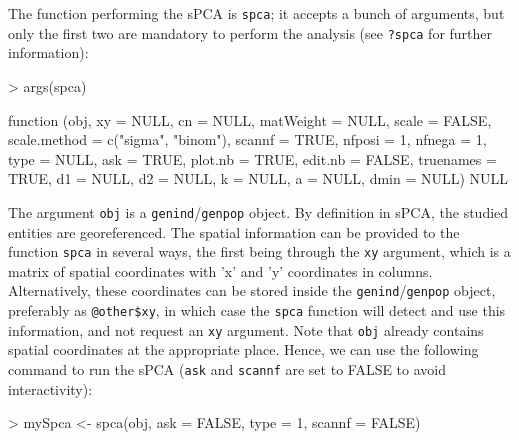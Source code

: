 \documentclass{article}
\begin{document}
The function performing the sPCA is \texttt{spca}; it accepts a bunch
of arguments, but only the first two are mandatory to perform the
analysis (see \texttt{?spca} for further information):
\begin{Schunk}
\begin{Sinput}
> args(spca)
\end{Sinput}
\begin{Soutput}
function (obj, xy = NULL, cn = NULL, matWeight = NULL, scale = FALSE, 
    scale.method = c("sigma", "binom"), scannf = TRUE, nfposi = 1, 
    nfnega = 1, type = NULL, ask = TRUE, plot.nb = TRUE, edit.nb = FALSE, 
    truenames = TRUE, d1 = NULL, d2 = NULL, k = NULL, a = NULL, 
    dmin = NULL) 
NULL
\end{Soutput}
\end{Schunk}
The argument \texttt{obj} is a \texttt{genind}/\texttt{genpop} object.
By definition in sPCA, the studied entities are georeferenced.
The spatial information can be provided to the function \texttt{spca}
in several ways, the first being through the \texttt{xy} argument,
which is a matrix of spatial coordinates with
'x' and 'y' coordinates in columns.
Alternatively, these coordinates can be stored inside the
\texttt{genind}/\texttt{genpop} object, preferably as
\texttt{@other\$xy}, in which case the \texttt{spca} function will detect and use this information,
and not
request an \texttt{xy} argument.
Note that \texttt{obj} already contains spatial coordinates at the
appropriate place.
Hence, we can use the following command to run the sPCA (\texttt{ask} and \texttt{scannf}
are set to FALSE to avoid interactivity):
\begin{Schunk}
\begin{Sinput}
> mySpca <- spca(obj, ask = FALSE, type = 1, scannf = FALSE)
\end{Sinput}
\end{Schunk}
~\\
\end{document}
